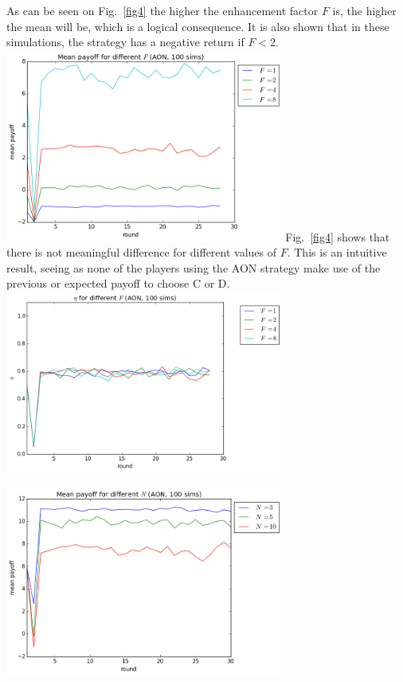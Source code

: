 \documentclass[letterpaper]{article}
\begin{document}
As can be seen on Fig.~\ref{fig4} the higher the enhancement factor $F$ is, the higher the mean will be, which is a logical consequence. It is also shown that in these simulations, the strategy has a negative return if $F<2$.
\includegraphics[width=3.6in,angle=0]{img/meanpayoff_F_aon.png}
\label{fig3}
Fig.~\ref{fig4} shows that there is not meaningful difference for different values of $F$. This is an intuitive result, seeing as none of the players using the AON strategy make use of the previous or expected payoff to choose C or D.
\includegraphics[width=3.6in,angle=0]{img/cfraction_F_aon.png}
\label{fig4}

\includegraphics[width=3.6in,angle=0]{img/meanpayoff_N_aon.png}
\label{fig5}
\end{document}
